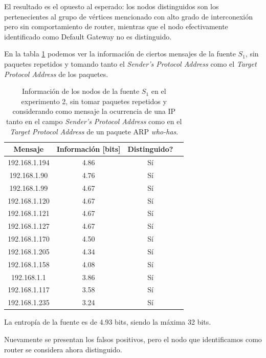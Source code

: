 \par El resultado es el opuesto al esperado: los nodos distinguidos son los pertenecientes al grupo de vértices mencionado con alto grado de interconexión pero sin comportamiento de router, mientras que el nodo efectivamente identificado como Default Gateway no es distinguido.

\par En la tabla \ref{tab2A} podemos ver la información de ciertos mensajes de la fuente $S_1$, sin paquetes repetidos y tomando tanto el \textit{Sender's Protocol Address} como el \textit{Target Protocol Address} de los paquetes.

\begin{table}[t]
    \centering
    \begin{tabular}{ | c | c | c | l |}
        \hline
        Mensaje & Información [bits] & Distinguido?\\
\hline
192.168.1.194 & 4.86 & Sí \\
\hline
192.168.1.90 & 4.76 & Sí \\
\hline
192.168.1.99 & 4.67 & Sí \\
\hline
192.168.1.120 & 4.67 & Sí \\
\hline
192.168.1.121 & 4.67 & Sí \\
\hline
192.168.1.127 & 4.67 & Sí \\
\hline
192.168.1.170 & 4.50 & Sí \\
\hline
192.168.1.205 & 4.34 & Sí \\
\hline
192.168.1.158 & 4.08 & Sí \\
\hline
192.168.1.1 & 3.86 & Sí \\
\hline
192.168.1.117 & 3.58 & Sí \\
\hline
192.168.1.235 & 3.24 & Sí \\
\hline
    \end{tabular} 
    \caption{Información de los nodos de la fuente $S_1$ en el experimento 2, sin tomar paquetes repetidos y considerando como mensaje la ocurrencia de una IP tanto en el campo \textit{Sender's Protocol Address} como en el \textit{Target Protocol Address} de un paquete ARP \textit{who-has}.}
    \label{tab2A}
\end{table} 

\par La entropía de la fuente es de 4.93 bits, siendo la máxima 32 bits. 

\par Nuevamente se presentan los falsos positivos, pero el nodo que identificamos como router se considera ahora distinguido.

